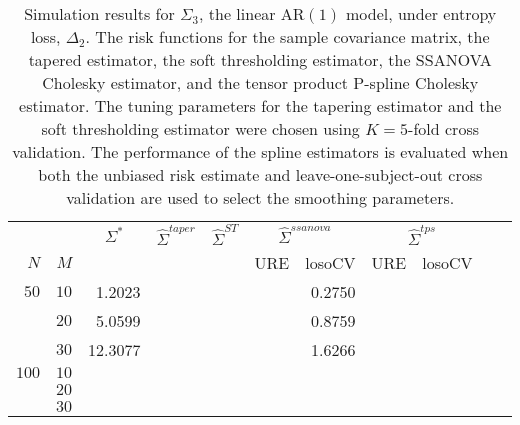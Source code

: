 \documentclass[12pt]{article}
\newcommand{\ra}[1]{\renewcommand{\arraystretch}{#1}}
\theoremstyle{definition}
\begin{document}
\begin{table}\centering
\ra{1.3}
\caption{Simulation results for $\Sigma_3$, the linear $\mbox{AR}\left(1\right)$ model, under entropy loss, $\Delta_2$. The risk functions for the sample covariance matrix, the tapered estimator, the soft thresholding estimator, the SSANOVA Cholesky estimator, and the tensor product P-spline Cholesky estimator. The tuning parameters for the tapering estimator and the soft thresholding estimator were chosen using $K = 5$-fold cross validation. The performance of the spline estimators is evaluated when both the unbiased risk estimate and leave-one-subject-out cross validation are used to select the smoothing parameters.}
\begin{tabular}{@{}rrrcrcrrcrr@{}}\toprule
   &            & \multicolumn{1}{c}{$\Sigma^*$}  & \multicolumn{1}{c}{$\hat{\Sigma}^{taper}$} &\multicolumn{1}{c}{$\hat{\Sigma}^{ST}$} &\multicolumn{2}{c}{ $\hat{\Sigma}^{ssanova}$} &  \multicolumn{2}{c}{ $\hat{\Sigma}^{tps}$}\\
$N$ & $M$ 	&	  &	& & \multicolumn{1}{c}{\mbox{URE}} & \multicolumn{1}{c}{\mbox{losoCV}} &\multicolumn{1}{c}{\mbox{URE}} & \multicolumn{1}{c}{\mbox{losoCV}}\\ \midrule
$50$ & $10$& 1.2023 &&&& 0.2750 &&\\
  & $20$  & 5.0599  &&&& 0.8759 &&\\
  & $30$   &  12.3077  &&&&1.6266 &&\\
$100$ & $10$ &&&&&&&\\
& $20$  &&&&&&& \\
& $30$  &&&&&&& \\
\bottomrule
\end{tabular}
\end{table}

\end{document}
